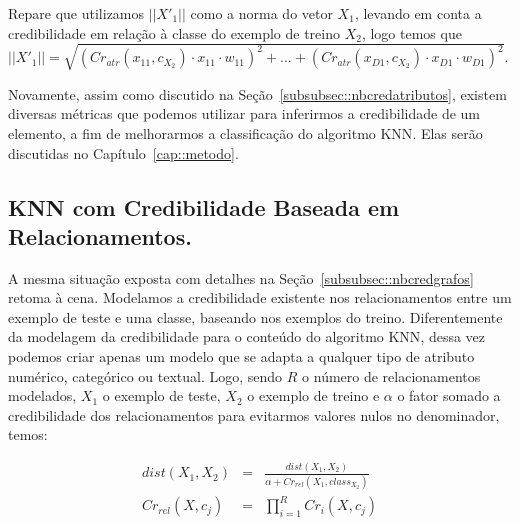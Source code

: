 Repare que utilizamos $||X'_1||$ como a norma do vetor $X_1$, levando em conta a credibilidade em relação à classe do exemplo de treino $X_2$, logo temos que $||X'_1|| = \sqrt{ ( Cr_{atr}(x_{11}, c_{X_2}) \cdot x_{11} \cdot w_{11} )^2 + ... +  ( Cr_{atr}(x_{D1}, c_{X_2}) \cdot x_{D1} \cdot w_{D1} )^2}$.

Novamente, assim como discutido na Seção~\ref{subsubsec::nbcredatributos}, existem diversas métricas que podemos utilizar para inferirmos a credibilidade de um elemento, a fim de melhorarmos a classificação do algoritmo \textsc{KNN}. Elas serão discutidas no Capítulo~\ref{cap::metodo}.

\subsection{\textsc{KNN} com Credibilidade Baseada em Relacionamentos.}
\label{subsubsec::knncredgrafos}

A mesma situação exposta com detalhes na Seção~\ref{subsubsec::nbcredgrafos} retoma à cena. Modelamos a credibilidade existente nos relacionamentos entre um exemplo de teste e uma classe, baseando nos exemplos do treino. 
Diferentemente da modelagem da credibilidade para o conteúdo do algoritmo \textsc{KNN}, dessa vez podemos criar apenas um modelo que se adapta a qualquer tipo de atributo numérico, categórico ou textual. Logo, sendo $R$ o número de relacionamentos modelados, $X_1$ o exemplo de teste, $X_2$ o exemplo de treino e $\alpha$ o fator somado a credibilidade dos relacionamentos para evitarmos valores nulos no denominador, temos:

\begin{eqnarray}\label{eqn::distancia_grafos}
    dist(X_1, X_2) & = & \frac{ dist(X_1, X_2) } { \alpha + Cr_{rel}(X_1, class_{X_2}) }\\
    Cr_{rel}(X, c_j) & = & \prod^{R}_{i=1} {Cr_{i}(X,c_j)} 
\end{eqnarray}

